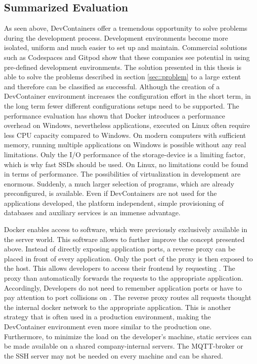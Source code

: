     \subsection{Summarized Evaluation}
    As seen above, DevContainers offer a tremendous opportunity to solve problems during the development process. Development environments become more isolated, uniform and much easier to set up and maintain. Commercial solutions such as Codespaces and Gitpod show that these companies see potential in using pre-defined development environments.\newline
    The solution presented in this thesis is able to solve the problems described in section \ref{sec::problem} to a large extent and therefore can be classified as successful. Although the creation of a DevContainer environment increases the configuration effort in the short term, in the long term fewer different configurations setups need to be supported. The performance evaluation has shown that Docker introduces a performance overhead on Windows, nevertheless applications, executed on Linux often require less CPU capacity compared to Windows. On modern computers with sufficient memory, running multiple applications on Windows is possible without any real limitations. Only the I/O performance of the storage-device is a limiting factor, which is why fast SSDs should be used. On Linux, no limitations could be found in terms of performance. \newline
    The possibilities of virtualization in development are enormous. Suddenly, a much larger selection of programs, which are already preconfigured, is available. Even if DevContainers are not used for the applications developed, the platform independent, simple provisioning of databases and auxiliary services is an immense advantage.

    Docker enables access to software, which were previously exclusively available in the server world. This software allows to further improve the concept presented above. Instead of directly exposing application ports, a reverse proxy can be placed in front of every application. Only the port of the proxy is then exposed to the host. This allows developers to access their frontend by requesting . The proxy than automatically forwards the requests to the appropriate application. Accordingly, Developers do not need to remember application ports or have to pay attention to port collisions on . The reverse proxy routes all requests thought the internal docker network to the appropriate application. This is another strategy that is often used in a production environment, making the DevContainer environment even more similar to the production one. Furthermore, to minimize the load on the developer's machine, static services can be made available on a shared company-internal servers. The MQTT-broker or the \ac{SSH} server may not be needed on every machine and can be shared.
